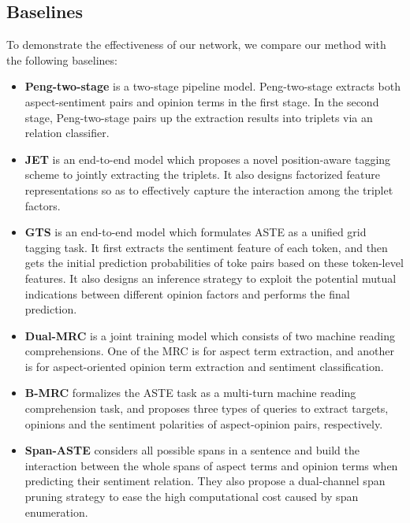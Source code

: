 \documentclass[11pt]{article}
\begin{document}
\subsection{Baselines}
To demonstrate the effectiveness of our network, we compare our method with the following baselines:
\begin{itemize}
	
	\item \textbf{Peng-two-stage} \cite{DBLP:conf/aaai/PengXBHLS20} is a two-stage pipeline model. Peng-two-stage extracts both aspect-sentiment pairs and opinion terms in the first stage. In the second stage, Peng-two-stage pairs up the extraction results into triplets via an relation classifier.
	
	\item \textbf{JET} \cite{DBLP:conf/emnlp/XuLLB20} is an end-to-end model which proposes a novel position-aware tagging scheme to jointly extracting the triplets. It also designs factorized feature representations so as to effectively capture the interaction among the triplet factors. 
	
	\item \textbf{GTS} \cite{DBLP:journals/corr/abs-2010-04640} is an end-to-end model which formulates ASTE as a unified grid tagging task. It first extracts the sentiment feature of each token, and then
	gets the initial prediction probabilities of toke pairs based on these token-level features. It also designs an inference strategy to exploit the potential mutual indications between different opinion factors and performs the final prediction.
	
	\item \textbf{Dual-MRC} \cite{DBLP:conf/aaai/MaoSYC21} is a joint training model which consists of two machine reading comprehensions. One of the MRC is for aspect term extraction, and another is for aspect-oriented opinion term extraction and sentiment classification.
	
	\item \textbf{B-MRC} \cite{chen2021bidirectional} formalizes the ASTE task as a multi-turn machine reading comprehension task, and proposes three types of queries to extract targets, opinions and the sentiment polarities of aspect-opinion pairs, respectively.
	
	\item \textbf{Span-ASTE} \cite{DBLP:conf/acl/XuCB20} considers all possible spans in a sentence and build the interaction between the whole spans of aspect terms and opinion terms when predicting their sentiment relation. They also propose a dual-channel span pruning strategy to ease the high computational cost caused by span enumeration.
	
\end{itemize}
\end{document}
